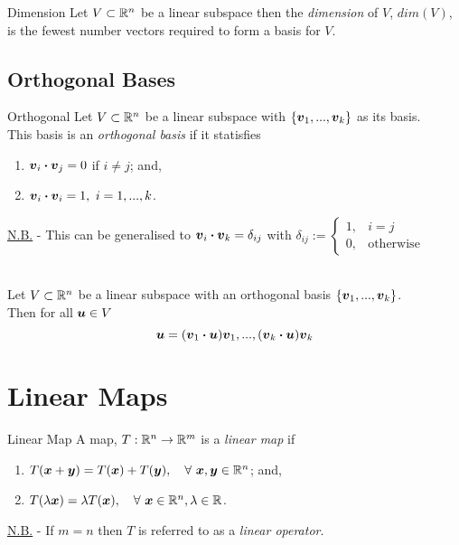 \documentclass[11pt,a4paper]{article}
\begin{document}
\subtitle{Definition 4.07 - }{Dimension}
Let $V \subset \mathbb{R}^n$ be a linear subspace then the \textit{dimension} of $V$, $dim(V)$, is the fewest number vectors required to form a basis for $V$.

\subsection{Orthogonal Bases}
%
\subtitle{Definition 4.08 - }{Orthogonal}
Let $V \subset \mathbb{R}^n$ be a linear subspace with $\{\boldsymbol{v}_1 , ... , \boldsymbol{v}_k\}$ as its basis.\\
This basis is an \textit{orthogonal basis} if it statisfies
\begin{enumerate}[label=\roman*)]
  \item $\boldsymbol{v}_i \boldsymbol{\cdot} \boldsymbol{v}_j = 0$ if $i \not = j$; and,
  \item $\boldsymbol{v}_i \boldsymbol{\cdot} \boldsymbol{v}_i = 1,\ i = 1, ... , k$.
\end{enumerate}
\underline{N.B.} - This can be generalised to $\boldsymbol{v}_i \boldsymbol{\cdot} \boldsymbol{v}_k = \delta_{ij}$ with $\delta_{ij} := \begin{cases} 1, & i = j \\ 0, & \mathrm{otherwise}\end{cases}$\\\\

\subtitle{Theorem 4.09}{}
Let $V \subset \mathbb{R}^n$ be a linear subspace with an orthogonal basis $\{\boldsymbol{v}_1 , ... , \boldsymbol{v}_k\}$. \\
Then for all $\boldsymbol{u} \in V$ $$\boldsymbol{u} = (\boldsymbol{v}_1 \boldsymbol{\cdot} \boldsymbol{u}) \boldsymbol{v}_1 , ... , (\boldsymbol{v}_k \boldsymbol{\cdot} \boldsymbol{u}) \boldsymbol{v}_k$$

\section{Linear Maps}

\subtitle{Definition 5.01 - }{Linear Map}
A map, $T : \mathbb{R}^n \to \mathbb{R}^m$ is a \textit{linear map} if
\begin{enumerate}[label=\roman*)]
  \item $T(\boldsymbol{x} + \boldsymbol{y}) = T(\boldsymbol{x}) + T(\boldsymbol{y}),\quad \forall\ \boldsymbol{x}, \boldsymbol{y} \in \mathbb{R}^n$; and,
  \item $T(\lambda\boldsymbol{x}) = \lambda T(\boldsymbol{x}),\quad \forall\ \boldsymbol{x} \in \mathbb{R}^n, \lambda \in \mathbb{R}$.
\end{enumerate}
\underline{N.B.} - If $m = n$ then $T$ is referred to as a \textit{linear operator}. \\
\end{document}
